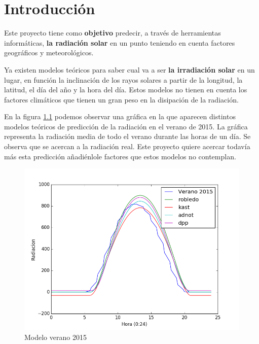 \cleardoublepage

\chapter{Introducción}
\label{makereference}

Este proyecto tiene como \textbf{objetivo} predecir, a través de herramientas informáticas, \textbf{la radiación solar} en un punto teniendo en cuenta factores geográficos y meteorológicos.

Ya existen modelos teóricos para saber cual va a ser \textbf{la irradiación solar} en un lugar, en función la inclinación de los rayos solares a partir de la longitud, la latitud, el día del año y la hora del día. Estos modelos no tienen en cuenta los factores climáticos que tienen un gran peso en la disipación de la radiación.

En la figura \ref{modelo_verano} podemos observar una gráfica en la que aparecen distintos modelos teóricos de predicción de la radiación en el verano de 2015. La gráfica representa la radiación media de todo el verano durante las horas de un día. Se observa que se acercan a la radiación real. Este proyecto quiere acercar todavía más esta predicción añadiénlole factores que estos modelos no contemplan.

\begin{figure}[htb]%
	\begin{center}
		\includegraphics[width=12cm]{figures/verano2015.png}
		\caption{Modelo verano 2015}
	\end{center}
    \label{modelo_verano}
\end{figure}

